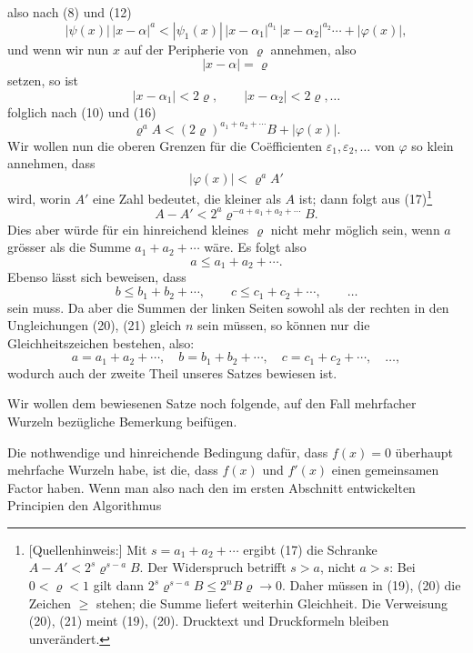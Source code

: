 
also nach (8) und (12)
\begin{equation}
 |\psi(x)|\,|x-\alpha|^a<|\psi_1(x)|\,|x-\alpha_1|^{a_1}\,|x-\alpha_2|^{a_2}\cdots+|\varphi(x)|,
\tag{16}
\end{equation}
und wenn wir nun $x$ auf der Peripherie von $\varrho$ annehmen, also
\[
 |x-\alpha|=\varrho
\]
setzen, so ist
\[
 |x-\alpha_1|<2\varrho,
 \qquad |x-\alpha_2|<2\varrho,
 \ldots
\]
folglich nach (10) und (16)
\begin{equation}
 \varrho^a A <(2\varrho)^{a_1+a_2+\cdots}B+|\varphi(x)|.
\tag{17}
\end{equation}
Wir wollen nun die oberen Grenzen für die Coëfficienten $\varepsilon_1,\varepsilon_2,
\ldots$ von $\varphi$ so klein annehmen, dass
\[
 |\varphi(x)|<\varrho^aA'
\]
wird, worin $A'$ eine Zahl bedeutet, die kleiner als $A$ ist; dann folgt aus (17)\begingroup\renewcommand{\thefootnote}{E1}\footnote[1]{[Quellenhinweis:] Mit $s=a_1+a_2+\cdots$ ergibt (17) die Schranke $A-A'<2^s\varrho^{s-a}B$. Der Widerspruch betrifft $s>a$, nicht $a>s$: Bei $0<\varrho<1$ gilt dann $2^s\varrho^{s-a}B\le 2^nB\varrho\to0$. Daher müssen in (19), (20) die Zeichen $\ge$ stehen; die Summe liefert weiterhin Gleichheit. Die Verweisung (20), (21) meint (19), (20). Drucktext und Druckformeln bleiben unverändert.}\endgroup
\begin{equation}
 A-A'<2^a\varrho^{-a+a_1+a_2+\cdots}B.
\tag{18}
\end{equation}
Dies aber würde für ein hinreichend kleines $\varrho$ nicht mehr möglich sein, wenn $a$ grösser als die Summe $a_1+a_2+\cdots$ wäre. Es folgt also
\begin{equation}
 a\le a_1+a_2+\cdots .
\tag{19}
\end{equation}
Ebenso lässt sich beweisen, dass
\begin{equation}
 b\le b_1+b_2+\cdots,
 \qquad
 c\le c_1+c_2+\cdots,
 \qquad \ldots
\tag{20}
\end{equation}
sein muss. Da aber die Summen der linken Seiten sowohl als der rechten in den Ungleichungen (20), (21) gleich $n$ sein müssen,
so können nur die Gleichheitszeichen bestehen, also:
\[
 a=a_1+a_2+\cdots,
 \quad b=b_1+b_2+\cdots,
 \quad c=c_1+c_2+\cdots,
 \quad \ldots,
\]
wodurch auch der zweite Theil unseres Satzes bewiesen ist.

Wir wollen dem bewiesenen Satze noch folgende, auf den Fall mehrfacher Wurzeln bezügliche Bemerkung beifügen.

Die nothwendige und hinreichende Bedingung dafür, dass $f(x)=0$ überhaupt mehrfache Wurzeln habe, ist die, dass $f(x)$ und $f'(x)$ einen gemeinsamen Factor haben. Wenn man also nach den im ersten Abschnitt entwickelten Principien den Algorithmus
